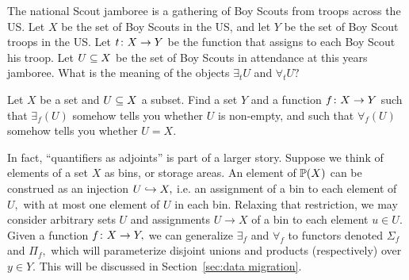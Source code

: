 \documentclass[CT4S-EN-RU]{subfiles}
\begin{document}
\begin{exampleRUS}
\end{exampleRUS}

\begin{exerciseENG}
The national Scout jamboree is a gathering of Boy Scouts from troops across the US. Let $X$ be the set of Boy Scouts in the US, and let $Y$ be the set of Boy Scout troops in the US. Let $t\taking X\to Y$ be the function that assigns to each Boy Scout his troop. Let $U\ss X$ be the set of Boy Scouts in attendance at this years jamboree. What is the meaning of the objects $\exists_tU$ and $\forall_tU?$
\end{exerciseENG}

\begin{exerciseRUS}
\end{exerciseRUS}

\begin{exerciseENG}
Let $X$ be a set and $U\ss X$ a subset. Find a set $Y$ and a function $f\taking X\to Y$ such that $\exists_f(U)$ somehow tells you whether $U$ is non-empty, and such that $\forall_f(U)$ somehow tells you whether $U=X.$
\end{exerciseENG}

\begin{exerciseRUS}
\end{exerciseRUS}

\begin{blockENG}
In fact, “quantifiers as adjoints” is part of a larger story. Suppose we think of elements of a set $X$ as bins, or storage areas. An element of $\PP(X)$ can be construed as an injection $U\inj X,$ i.e. an assignment of a bin to each element of $U,$ with at most one element of $U$ in each bin. Relaxing that restriction, we may consider arbitrary sets $U$ and assignments $U\to X$ of a bin to each element $u\in U.$ Given a function $f\taking X\to Y,$ we can generalize $\exists_f$ and $\forall_f$ to functors denoted $\Sigma_f$ and $\Pi_f,$ which will parameterize disjoint unions and products (respectively) over $y\in Y.$ This will be discussed in Section~\ref{sec:data migration}.
\end{blockENG}

\begin{blockRUS}
\end{blockRUS}


\subsection{}\label{sec:universal concepts}
\end{document}
